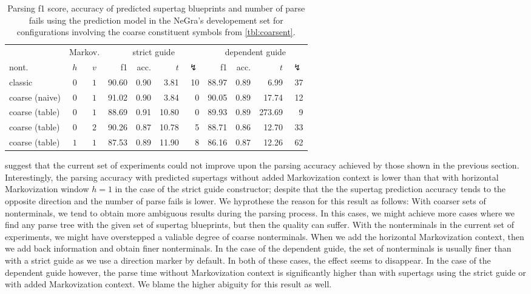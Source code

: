 \documentclass[../../document.tex]{subfiles}
\begin{document}
    \begin{table}
        \caption{\label{tbl:gridsearch:coarse:3}
        Parsing f1 score, accuracy of predicted supertag blueprints and number of parse fails using the  prediction model in the NeGra's developement set for configurations involving the coarse constituent symbols from \cref{tbl:coarsent}.
        }
        \centering
        \vspace{.2cm}
        \begin{tabular}{lcc|rrrr|rrrr}
            \toprule
& \multicolumn{2}{c|}{Markov.}         & \multicolumn{4}{c|}{strict guide} &  \multicolumn{4}{c}{dependent guide} \\
nont.           & \(h\) & \(v\) & f1 & acc. & $t$ & $\lightning$ & f1 & acc. & $t$ & $\lightning$  \\ \hline \rowcolor{black!10}
classic         & \(0\) & \(1\) & 90.60 & 0.90 & 3.81 & 10 & 88.97 & 0.89 & 6.99 & 37 \\\rowcolor{black!10}
coarse (naive)  & \(0\) & \(1\) & 91.02 & 0.90 & 3.84 & 0 & 90.05 & 0.89 & 17.74 & 12 \\\hline
coarse (table)  & \(0\) & \(1\) & 88.69 & 0.91 & 10.80 & 0 & 89.93 & 0.89 & 273.69 & 9 \\
coarse (table)  & \(0\) & \(2\) & 90.26 & 0.87 & 10.78 & 5 & 88.71 & 0.86 & 12.70 & 33 \\
coarse (table)  & \(1\) & \(1\) & 87.53 & 0.89 & 11.90 & 8 & 86.16 & 0.87 & 12.26 & 62 \\
\bottomrule
        \end{tabular}
    \end{table}
    
     suggest that the current set of experiments could not improve upon the parsing accuracy achieved by those shown in the previous section.
    Interestingly, the parsing accuracy with predicted supertags without added Markovization context is lower than that with horizontal Markovization window \(h=1\) in the case of the strict guide constructor; despite that the the supertag prediction accuracy tends to the opposite direction and the number of parse fails is lower.
    We hyprothese the reason for this result as follows:
        With coarser sets of nonterminals, we tend to obtain more ambiguous results during the parsing process.
        In this cases, we might achieve more cases where we find any parse tree with the given set of supertag blueprints, but then the quality can suffer.
        With the nonterminals in the current set of experiments, we might have overstepped a valiable degree of coarse nonterminals.
        When we add the horizontal Markovization context, then we add back information and obtain finer nonterminals.
        In the case of the dependent guide, the set of nonterminals is usually finer than with a strict guide as we use a direction marker by default.
        In both of these cases, the effect seems to disappear.
    In the case of the dependent guide however, the parse time without Markovization context is significantly higher than with supertags using the strict guide or with added Markovization context.
    We blame the higher abiguity for this result as well.
\end{document}
